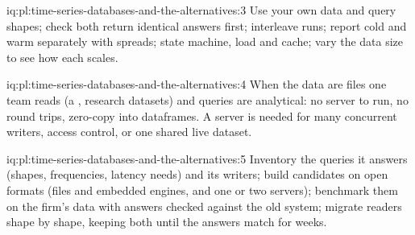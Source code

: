 \begin{solution}{iq:pl:time-series-databases-and-the-alternatives:3}
Use your own data and query shapes; check both return identical answers first; interleave runs; report cold and warm separately
with spreads; state machine, load and cache; vary the data size to see how each scales.
\end{solution}

\begin{solution}{iq:pl:time-series-databases-and-the-alternatives:4}
When the data are files one team reads (a , research datasets) and queries are analytical: no server to run, no
round trips, zero-copy into dataframes. A server is needed for many concurrent writers, access control, or one shared live
dataset.
\end{solution}

\begin{solution}{iq:pl:time-series-databases-and-the-alternatives:5}
Inventory the queries it answers (shapes, frequencies, latency needs) and its writers; build candidates on open formats (files
and embedded engines, and one or two servers); benchmark them on the firm's data with answers checked against the old system;
migrate readers shape by shape, keeping both until the answers match for weeks.
\end{solution}
